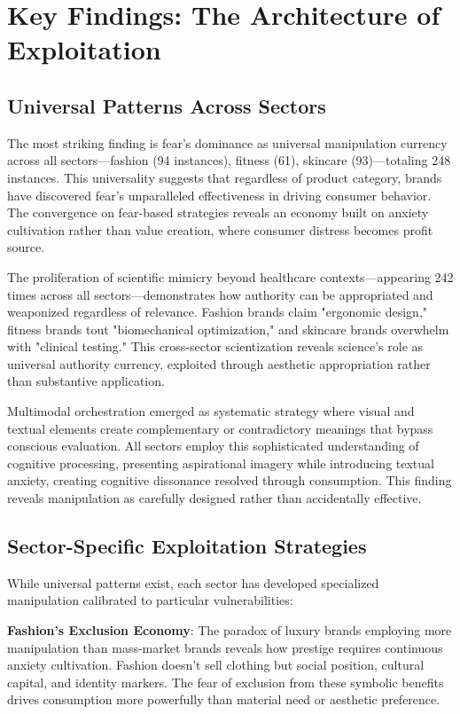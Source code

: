 \section{Key Findings: The Architecture of Exploitation}
\label{sec:key_findings}

\subsection{Universal Patterns Across Sectors}

The most striking finding is fear's dominance as universal manipulation currency across all sectors—fashion (94 instances), fitness (61), skincare (93)—totaling 248 instances. This universality suggests that regardless of product category, brands have discovered fear's unparalleled effectiveness in driving consumer behavior. The convergence on fear-based strategies reveals an economy built on anxiety cultivation rather than value creation, where consumer distress becomes profit source.

The proliferation of scientific mimicry beyond healthcare contexts—appearing 242 times across all sectors—demonstrates how authority can be appropriated and weaponized regardless of relevance. Fashion brands claim "ergonomic design," fitness brands tout "biomechanical optimization," and skincare brands overwhelm with "clinical testing." This cross-sector scientization reveals science's role as universal authority currency, exploited through aesthetic appropriation rather than substantive application.

Multimodal orchestration emerged as systematic strategy where visual and textual elements create complementary or contradictory meanings that bypass conscious evaluation. All sectors employ this sophisticated understanding of cognitive processing, presenting aspirational imagery while introducing textual anxiety, creating cognitive dissonance resolved through consumption. This finding reveals manipulation as carefully designed rather than accidentally effective.

\subsection{Sector-Specific Exploitation Strategies}

While universal patterns exist, each sector has developed specialized manipulation calibrated to particular vulnerabilities:

\textbf{Fashion's Exclusion Economy}: The paradox of luxury brands employing more manipulation than mass-market brands reveals how prestige requires continuous anxiety cultivation. Fashion doesn't sell clothing but social position, cultural capital, and identity markers. The fear of exclusion from these symbolic benefits drives consumption more powerfully than material need or aesthetic preference.

